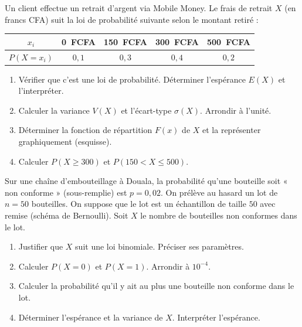\documentclass[11pt]{article}
\begin{document}
\begin{exercice}
Un client effectue un retrait d'argent via Mobile Money. Le frais de retrait $X$ (en francs CFA) suit la loi de probabilité suivante selon le montant retiré :
\begin{center}
\begin{tabular}{|c|c|c|c|c|}
\hline
$x_i$ & \SI{0}{FCFA} & \SI{150}{FCFA} & \SI{300}{FCFA} & \SI{500}{FCFA} \\
\hline
$P(X=x_i)$ & $0,1$ & $0,3$ & $0,4$ & $0,2$ \\
\hline
\end{tabular}
\end{center}
\begin{enumerate}
    \item Vérifier que c'est une loi de probabilité. Déterminer l'espérance $E(X)$ et l'interpréter.
    \item Calculer la variance $V(X)$ et l'écart-type $\sigma(X)$. Arrondir à l'unité.
    \item Déterminer la fonction de répartition $F(x)$ de $X$ et la représenter graphiquement (esquisse).
    \item Calculer $P(X \geq 300)$ et $P(150 < X \leq 500)$.
\end{enumerate}
\end{exercice}

\begin{exercice}
Sur une chaîne d'embouteillage à Douala, la probabilité qu'une bouteille soit « non conforme » (sous-remplie) est $p = 0,02$. On prélève au hasard un lot de $n = 50$ bouteilles. On suppose que le lot est un échantillon de taille $50$ avec remise (schéma de Bernoulli). Soit $X$ le nombre de bouteilles non conformes dans le lot.
\begin{enumerate}
    \item Justifier que $X$ suit une loi binomiale. Préciser ses paramètres.
    \item Calculer $P(X = 0)$ et $P(X = 1)$. Arrondir à $10^{-4}$.
    \item Calculer la probabilité qu'il y ait au plus une bouteille non conforme dans le lot.
    \item Déterminer l'espérance et la variance de $X$. Interpréter l'espérance.
\end{enumerate}
\end{exercice}
\end{document}
